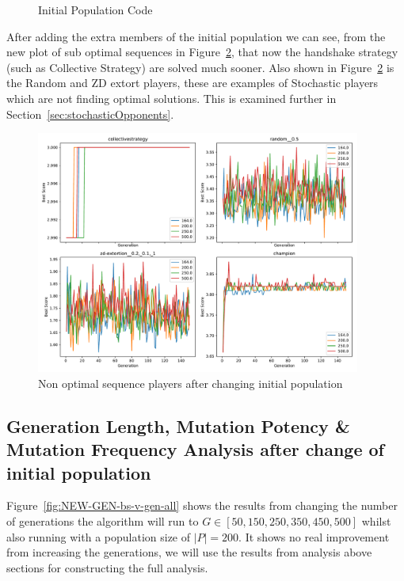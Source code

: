 \begin{figure}
    \inputminted{python}{code_snippets/initialPopulationCode.py}
    \caption{Initial Population Code}\label{code:initialPopulationCode}
\end{figure}

After adding the extra members of the initial population we can see, from the new plot of sub optimal sequences in Figure~\ref{fig:NEW-INIT-POP-bs-v-gen-non-performers}, that now the handshake strategy (such as Collective Strategy) are solved much sooner.
Also shown in Figure~\ref{fig:NEW-INIT-POP-bs-v-gen-non-performers} is the Random and ZD extort players, these are examples of Stochastic players which are not finding optimal solutions.
This is examined further in Section~\ref{sec:stochasticOpponents}.

\begin{figure}[ht]
    \includegraphics[width=0.95\textwidth, keepaspectratio, center]{./img/plots/NEW_INIT_POP_bs_v_gen_non_performers.pdf}
    \caption{Non optimal sequence players after changing initial population}\label{fig:NEW-INIT-POP-bs-v-gen-non-performers}
\end{figure}

\subsection{Generation Length, Mutation Potency \& Mutation Frequency Analysis after change of initial population}\label{subsec:starting_pop_analysis}
Figure~\ref{fig:NEW-GEN-bs-v-gen-all} shows the results from changing the number of generations the algorithm will run to \(G \in [50,150,250,350,450,500] \) whilst also running with a population size of \(|P|=200\).
It shows no real improvement from increasing the generations, we will use the results from analysis above sections for constructing the full analysis.

